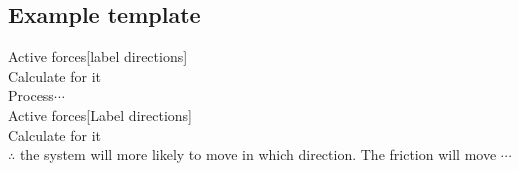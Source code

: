\subsection{Example template}
\begin{center}
    Active forces[label directions]\\
    Calculate for it\\
    Process$\cdots$\\
    Active forces[Label directions]\\
    Calculate for it\\
    $\therefore$ the system will more likely to move in which direction. The friction will move $\cdots$
\end{center}
